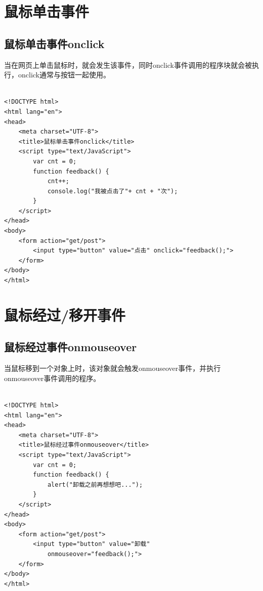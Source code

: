 \newpage

\section{鼠标单击事件}

\subsection{鼠标单击事件onclick}

当在网页上单击鼠标时，就会发生该事件，同时onclick事件调用的程序块就会被执行，onclick通常与按钮一起使用。\\

\\

\begin{lstlisting}[style=htmlcssjs]
<!DOCTYPE html>
<html lang="en">
<head>
    <meta charset="UTF-8">
    <title>鼠标单击事件onclick</title>
    <script type="text/JavaScript">
        var cnt = 0;
        function feedback() {
            cnt++;
            console.log("我被点击了"+ cnt + "次");
        }
    </script>
</head>
<body>
    <form action="get/post">
        <input type="button" value="点击" onclick="feedback();">
    </form>
</body>
</html>
\end{lstlisting}

\newpage

\section{鼠标经过/移开事件}

\subsection{鼠标经过事件onmouseover}

当鼠标移到一个对象上时，该对象就会触发onmouseover事件，并执行onmouseover事件调用的程序。\\

\\

\begin{lstlisting}[style=htmlcssjs]
<!DOCTYPE html>
<html lang="en">
<head>
    <meta charset="UTF-8">
    <title>鼠标经过事件onmouseover</title>
    <script type="text/JavaScript">
        var cnt = 0;
        function feedback() {
            alert("卸载之前再想想吧...");
        }
    </script>
</head>
<body>
    <form action="get/post">
        <input type="button" value="卸载"
            onmouseover="feedback();">
    </form>
</body>
</html>
\end{lstlisting}

